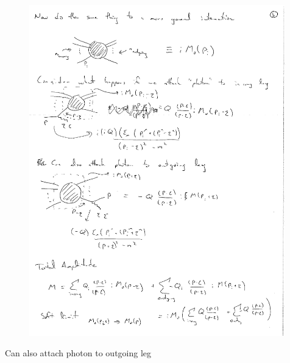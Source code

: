 {\begin{figure}[h]
\includegraphics[width=0.99\textwidth]{./incomingPhoton.pdf}
\end{figure}

\clearpage

Can also attach photon to outgoing leg

}

